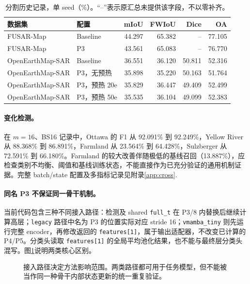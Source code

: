 \documentclass[UTF8,11pt,a4paper,fontset=fandol]{ctexart}
\begin{document}
\begin{table}[!htbp]\centering\small
\caption{分割历史记录，单 seed（\%）。“--”表示原汇总未提供该字段，不以零补齐。}
\label{tab:segmentation}
\begin{tabular}{llrrrr}
\toprule
数据集 & 配置 & mIoU & FWIoU & Dice & OA\\
\midrule
FUSAR-Map & Baseline & 44.297 & 65.382 & -- & 77.105\\
FUSAR-Map & P3 & 43.561 & 65.083 & -- & 76.770\\
OpenEarthMap-SAR & Baseline & 36.551 & 36.120 & 50.811 & 52.316\\
OpenEarthMap-SAR & P3，无预热 & 35.898 & 35.220 & 50.163 & 51.764\\
OpenEarthMap-SAR & P3，预热 20e & 35.829 & 36.447 & 49.409 & 52.499\\
OpenEarthMap-SAR & P3，预热 50e & 35.535 & 36.104 & 49.099 & 52.383\\
\bottomrule
\end{tabular}
\end{table}

\paragraph{变化检测。}
在 $m=16$、BS16 记录中，Ottawa 的 F1 从 92.091\% 到 92.249\%，Yellow River 从 88.368\% 到 86.891\%，Farmland 从 23.564\% 到 64.428\%，Sulzberger 从 72.591\% 到 66.180\%。Farmland 的较大改善伴随极低的基线召回（13.887\%），应检查类别不均衡、阈值和基线训练状态，不能直接作为已充分验证的通用机制证据。完整 batch/state 配置及多指标记录见附录\ref{app:cross}.

\paragraph{同名 P3 不保证同一骨干机制。}
当前代码包含三种不同接入路径：检测及 shared \texttt{full\_t} 在 P3/8 内替换后继续计算高层；\texttt{legacy} 路径中名为 P3 的位置实际对应 stride 16；\texttt{vmamba\_tiny} 则先运行完整 encoder，再修改返回的 \texttt{features[1]}，属于输出适配器，不改变已计算的 P4/P5。分类头读取 \texttt{features[1]} 的全局平均池化结果，也不能与最终层分类头混写。图\ref{fig:interfaces}说明两类核心区别。

\begin{figure}[tbp]\centering
{}
\caption{接入路径决定方法影响范围。两类路径都可用于任务模型，但不能被当作同一种骨干内部状态更新的统一重复验证。}
\label{fig:interfaces}
\end{figure}
\FloatBarrier
\end{document}
